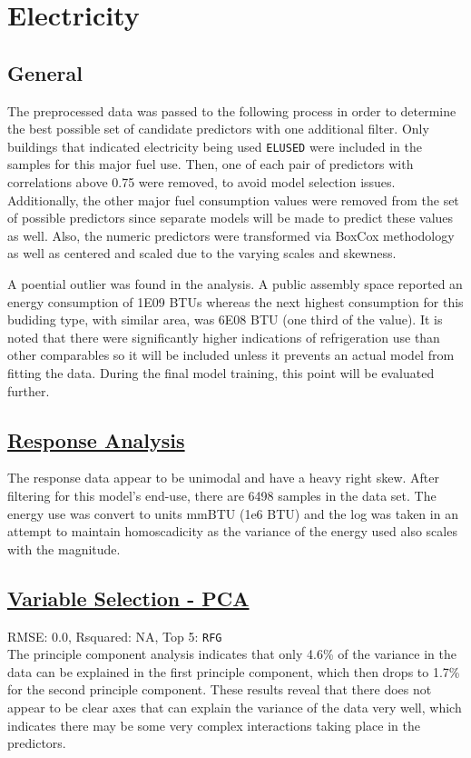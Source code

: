 \section*{Electricity}
\label{sec:electricity}

\subsection{General}

The preprocessed data was passed to the following process in order to determine the best possible set of candidate predictors with one additional filter.  Only buildings that indicated electricity being used \lstinline{ELUSED} were included in the samples for this major fuel use.  Then, one of each pair of predictors with correlations above 0.75 were removed, to avoid model selection issues. Additionally, the other major fuel consumption values were removed from the set of possible predictors since separate models will be made to predict these values as well.  Also, the numeric predictors were transformed via BoxCox methodology as well as centered and scaled due to the varying scales and skewness.

A poential outlier was found in the analysis. A public assembly space reported an energy consumption of 1E09 BTUs whereas the next highest consumption for this budiding type, with similar area, was  6E08 BTU (one third of the value).  It is noted that there were significantly higher indications of refrigeration use than other comparables so it will be included unless it prevents an actual model from fitting the data.  During the final model training, this point will be evaluated further.

\subsection{\hyperref[appendix:electricity:response]{Response Analysis}}

The response data appear to be unimodal and have a heavy right skew.  After filtering for this model's end-use, there are 6498 samples in the data set.  The energy use was convert to units mmBTU (1e6 BTU) and the log was taken in an attempt to maintain homoscadicity as the variance of the energy used also scales with the magnitude.

\subsection{\hyperref[appendix:electricity:pca]{Variable Selection - PCA}}
RMSE: 0.0, Rsquared: NA, Top 5: \lstinline{RFG}
\\[0.0in]
\indent The principle component analysis indicates that only 4.6\% of the variance in the data can be explained in the first principle component, which then drops to 1.7\% for the second principle component.  These results reveal that there does not appear to be clear axes that can explain the variance of the data very well, which indicates there may be some very complex interactions taking place in the predictors.

